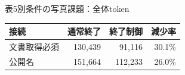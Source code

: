 \begin{center}\begin{minipage}{\columnwidth}\centering
\small 表5\quad 別条件の写真課題：全体token\par\smallskip
\begin{tabular}{lrrr}\hline
接続 & 通常終了 & 終了制御 & 減少率\\\hline
文書取得必須 & 130,439 & 91,116 & 30.1\%\\
公開名 & 151,664 & 112,233 & 26.0\%\\
\hline\end{tabular}
\end{minipage}\end{center}
